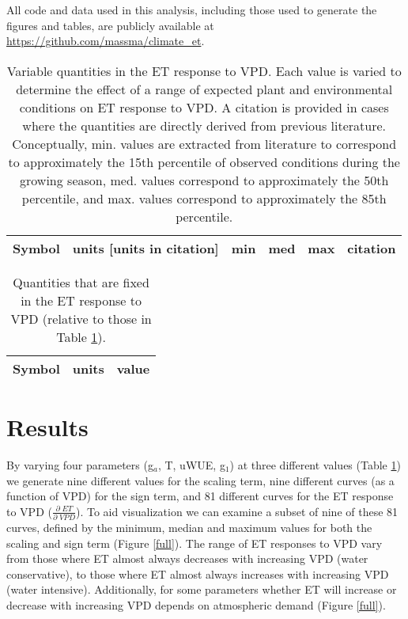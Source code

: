\documentclass[draft]{agujournal2019}
\begin{document}
All code and data used in this analysis, including those used to
generate the figures and tables, are publicly available at
\url{https://github.com/massma/climate_et}.

\begin{table}
  \caption{Variable quantities in the ET response to VPD. Each value
    is varied to determine the effect of a range of expected plant and
    environmental conditions on ET response to VPD. A citation is
    provided in cases where the quantities are directly derived from
    previous literature. Conceptually, min. values are extracted from
    literature to correspond to approximately the 15th percentile of
    observed conditions during the growing season, med. values
    correspond to approximately the 50th percentile, and max. values
    correspond to approximately the 85th percentile.}
  \label{param_varying}
  \centering
  \footnotesize
  \begin{tabular}{l c c c c c}
    \hline
    Symbol & units [units in citation] & min  & med & max
    & citation  \\
    \hline
    
    \hline
  \end{tabular}
\end{table}

\begin{table}
  \caption{Quantities that are fixed in the ET response to VPD
    (relative to those in Table \ref{param_varying}).}
  \label{param_fixed}
  \centering
  \begin{tabular}{l c c}
    \hline
    Symbol & units & value \\
    \hline
    
    \hline
  \end{tabular}
\end{table}

\section{Results}
\label{results}

By varying four parameters (g$_a$, T, uWUE, g$_1$) at three different
values (Table \ref{param_varying}) we generate nine different values
for the scaling term, nine different curves (as a function of VPD) for
the sign term, and 81 different curves for the ET response to VPD
($\frac{\partial \; ET}{\partial \; VPD}$). To aid visualization we
can examine a subset of nine of these 81 curves, defined by the
minimum, median and maximum values for both the scaling and sign term
(Figure \ref{full}). The range of ET responses to VPD vary from those
where ET almost always decreases with increasing VPD (water
conservative), to those where ET almost always increases with
increasing VPD (water intensive). Additionally, for some parameters
whether ET will increase or decrease with increasing VPD depends on
atmospheric demand (Figure \ref{full}).
\end{document}
